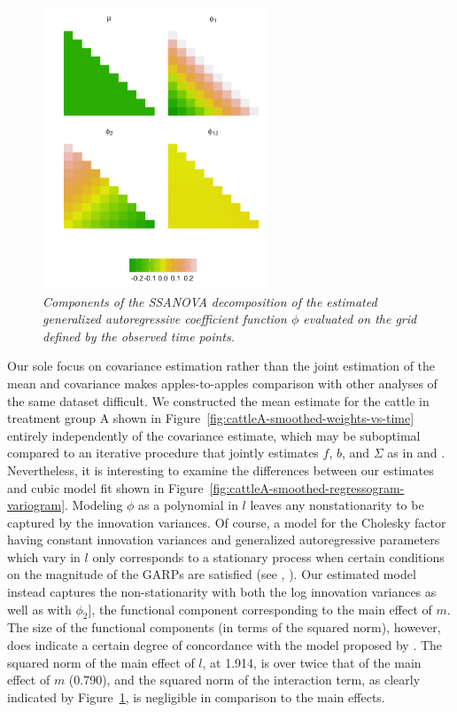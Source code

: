 %
\begin{figure}[H] 
\centering
  \includegraphics[width = 0.6\textwidth]{img/chapter-5/cattle-ssanova-estimate-lattice} 
  \caption{\textit{Components of the SSANOVA decomposition of the estimated generalized autoregressive coefficient function $\phi$ evaluated on the grid defined by the observed time points.}}\label{fig:cattle-fitted-cholesky-ssanova}
\end{figure}


Our sole focus on covariance estimation rather than the joint estimation of the mean and covariance makes apples-to-apples comparison with other analyses of the same dataset difficult. We constructed the mean estimate for the cattle in treatment group A shown in Figure~\ref{fig:cattleA-smoothed-weights-vs-time} entirely independently of the covariance estimate, which may be suboptimal compared to an iterative procedure that jointly estimates $f$, $b$, and $\Sigma$ as in \cite{pan2017jmcm} and \cite{pourahmadi1999joint}. Nevertheless, it is interesting to examine the differences between our estimates and cubic model fit shown in Figure~\ref{fig:cattleA-smoothed-regressogram-variogram}. Modeling $\phi$ as a polynomial in $l$ leaves any nonstationarity to be captured by the innovation variances. Of course, a model for the Cholesky factor having constant innovation variances and generalized autoregressive parameters which vary in $l$ only corresponds to a stationary process when certain conditions on the magnitude of the GARPs are satisfied (see \citep{klein1997statistical}, \citep{madsen2007time}). Our estimated model instead captures the non-stationarity with both the log innovation variances as well as with $\phi_2]$, the functional component corresponding to the main effect of $m$. The size of the functional components (in terms of the squared norm), however, does indicate a certain degree of concordance with the model proposed by \cite{pourahmadi1999joint}. The squared norm of the main effect of $l$, at 1.914, is over twice that of the main effect of $m$ (0.790), and the squared norm of the interaction term, as clearly indicated by Figure~\ref{fig:cattle-fitted-cholesky-ssanova}, is negligible in comparison to the main effects.



%
%
%
